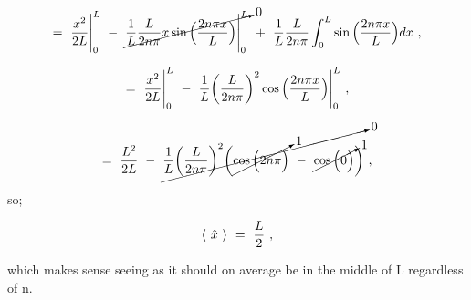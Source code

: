 \documentclass{article}
\begin{document}
\begin{equation} \label{eb-eq-245-1}
= \hspace{0.125cm} \frac{x^2}{2L} \Bigg|_{0}^{L} \hspace{0.125cm} - \hspace{0.125cm} 
\cancelto{0}{\frac{1}{L} \frac{L}{2n\pi} x \sin\Big(\frac{2n\pi x}{L}\Big) \Bigg|_{0}^{L}} \hspace{0.125cm} + \hspace{0.125cm} \frac{1}{L} \frac{L}{2n\pi} \int_{0}^{L} \sin\Big(\frac{2n\pi x}{L}\Big) dx \hspace{0.125cm} ,
\end{equation}

\begin{equation} \label{eb-eq-246-1}
= \hspace{0.125cm} \frac{x^2}{2L} \Bigg|_{0}^{L} \hspace{0.125cm} - \hspace{0.125cm} \frac{1}{L} \bigg(\frac{L}{2n\pi}\bigg)^{2}  \cos\Big(\frac{2n\pi x}{L}\Big) \Bigg|_{0}^{L} \hspace{0.125cm} ,
\end{equation}

\begin{equation} \label{eb-eq-247-1}
= \hspace{0.125cm} \frac{L^2}{2L} \hspace{0.125cm} - \hspace{0.125cm} \cancelto{0}{\frac{1}{L} \bigg(\frac{L}{2n\pi}\bigg)^{2} \bigg( \cancelto{1}{\cos\Big( 2n\pi \Big)} \hspace{0.125cm} - \hspace{0.125cm} \cancelto{1}{\cos\Big( 0 \Big)} \bigg)} \hspace{0.125cm} ,
\end{equation}

so;

\begin{equation} \label{eb-eq-248-1}
\langle \hspace{0.125cm} \hat{x} \hspace{0.125cm} \rangle \hspace{0.125cm} = \hspace{0.125cm} \frac{L}{2} \hspace{0.125cm} , 
\end{equation}

which makes sense seeing as it should on average be in the middle of L regardless of n.
\end{document}
